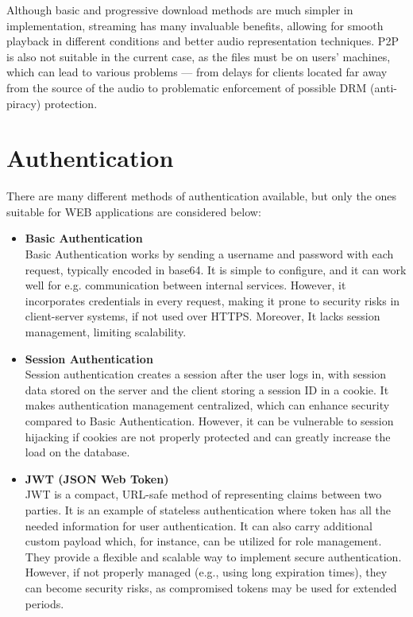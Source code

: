 Although basic and progressive download methods are much simpler in implementation,
streaming has many invaluable benefits, allowing for smooth playback in different
conditions and better audio representation techniques. P2P is also not suitable
in the current case, as the files must be on users' machines, which can lead
to various problems — from delays for clients located far away from the source of the audio
to problematic enforcement of possible DRM (anti-piracy) protection.


\section{Authentication}
There are many different methods of authentication available, but only the ones suitable for
WEB applications are considered below:
\begin{itemize}
    \item \textbf{Basic Authentication} \\
    Basic Authentication works by sending a username and password with each request,
    typically encoded in base64.\cite{basic_auth} It is simple to configure, and it can work well for
    e.g. communication between internal services. However, it incorporates credentials in every request,
    making it prone to security risks in client-server systems, if not used over HTTPS.
    Moreover, It lacks session management, limiting scalability.

    \item \textbf{Session Authentication} \\
    Session authentication creates a session after the user logs in, with session
    data stored on the server and the client storing a session ID in a cookie.
    It makes authentication management centralized, which can enhance security compared to Basic Authentication.
    However, it can be vulnerable to session hijacking if cookies are not properly protected
    and can greatly increase the load on the database.\cite{session_auth}

    \item \textbf{JWT (JSON Web Token)} \\
    JWT is a compact, URL-safe method of representing claims between two parties.\cite{jwt}
    It is an example of stateless authentication where token has all the needed information for user authentication.
    It can also carry additional custom payload which, for instance, can be utilized for role management.
    They provide a flexible and scalable way to implement secure authentication.
    However, if not properly managed (e.g., using long expiration times), they can become security risks,
    as compromised tokens may be used for extended periods.


\end{itemize}
